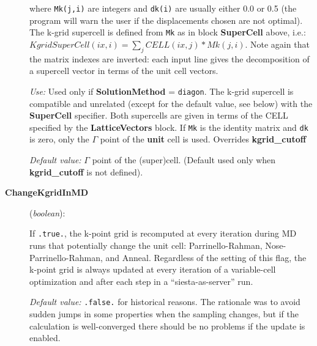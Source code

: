 \documentclass[11pt]{article}
\begin{document}
\begin{description}
where {\tt Mk(j,i)} are integers and {\tt dk(i)} are usually
either 0.0 or 0.5 (the program will warn the user if the displacements
chosen are not optimal).
The k-grid supercell is defined from {\tt Mk}
as in block {\bf SuperCell} above, i.e.:
$KgridSuperCell(ix,i) = \sum_j CELL(ix,j)*Mk(j,i)$.
Note again that the matrix indexes are inverted: each input line 
gives the decomposition of a supercell vector in terms of the unit
cell vectors.


{\it Use:} Used only if {\bf SolutionMethod} = {\tt diagon}.
The k-grid supercell is compatible and unrelated 
(except for the default value, see below)
with the {\bf SuperCell} specifier. Both supercells are given in 
terms of the CELL specified by the {\bf LatticeVectors} block.
If {\tt Mk} is the identity matrix and {\tt dk} 
is zero, only the $\Gamma$ point of the {\bf unit} cell is used. 
Overrides {\bf kgrid\_cutoff}

{\it Default value:} $\Gamma$ point of the (super)cell.
(Default used only when {\bf kgrid\_cutoff} is not defined).
        
\item[{\bf ChangeKgridInMD}] ({\it boolean}):

If {\tt .true.}, the k-point grid is
recomputed at every iteration during MD runs that potentially
change the unit cell: Parrinello-Rahman, Nose-Parrinello-Rahman, and
Anneal. Regardless of the setting of this flag, the k-point grid
is always updated at every iteration of a variable-cell optimization
and after each step in a ``siesta-as-server'' run.

{\it Default value:} {\tt .false.} for historical reasons. The
rationale was to avoid sudden jumps in some properties when the
sampling changes, but if the calculation is well-converged there
should be no problems if the update is enabled.

\end{description}
\end{document}
